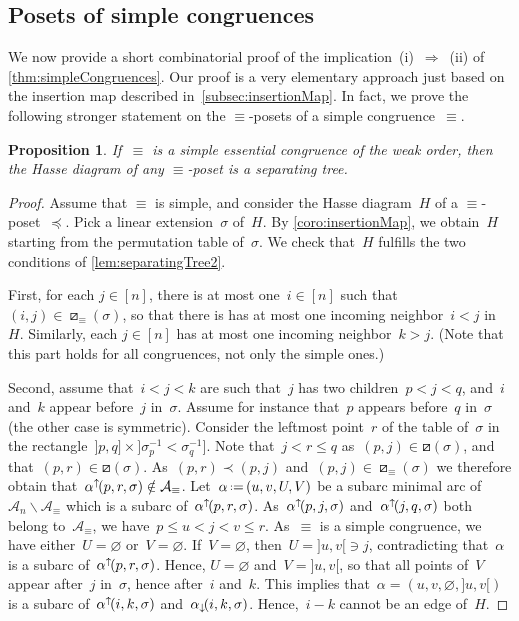 \documentclass{amsart}
\newtheorem{proposition}[theorem]{Proposition}
\theoremstyle{definition}
\newcommand{\ssm}{\smallsetminus} %
\newcommand{\eqdef}{\mbox{\,\raisebox{0.2ex}{\scriptsize\ensuremath{\mathrm:}}\ensuremath{=}\,}} %
\newcommand{\arcs}{{\mathcal{A}}} %
\newcommand{\arcDown}{\smash{\alpha_{\downarrow\!}}} %
\newcommand{\arcUp}{\smash{\alpha^{\uparrow\!}}} %
\begin{document}

\subsection{Posets of simple congruences}
\label{subsec:posetsSimpleCongruences}

We now provide a short combinatorial proof of the implication~(i)~$\Longrightarrow$~(ii) of \cref{thm:simpleCongruences}.
Our proof is a very elementary approach just based on the insertion map described in~\cref{subsec:insertionMap}.
In fact, we prove the following stronger statement on the $\equiv$-posets of a simple congruence~$\equiv$.

\begin{proposition}
\label{prop:simpleImpliesSeparatingTrees}
If~$\equiv$ is a simple essential congruence of the weak order, then the Hasse diagram of any $\equiv$-poset is a separating tree.
\end{proposition}

\begin{proof}
Assume that $\equiv$ is simple, and consider the Hasse diagram~$H$ of a $\equiv$-poset~$\preccurlyeq$.
Pick a linear extension~$\sigma$ of~$H$.
By \cref{coro:insertionMap}, we obtain~$H$ starting from the permutation table of~$\sigma$.
We check that~$H$ fulfills the two conditions of \cref{lem:separatingTree2}.

First, for each $j \in [n]$, there is at most one~$i \in [n]$ such that~$(i,j) \in \boxslash_\equiv(\sigma)$, so that there is has at most one incoming neighbor~$i < j$ in~$H$.
Similarly, each $j \in [n]$ has at most one incoming neighbor~$k > j$.
(Note that this part holds for all congruences, not only the simple ones.)

Second, assume that~$i < j < k$ are such that~$j$ has two children~$p < j < q$, and~$i$ and~$k$ appear before~$j$ in~$\sigma$.
Assume for instance that~$p$ appears before~$q$ in~$\sigma$ (the other case is symmetric).
Consider the leftmost point~$r$ of the table of~$\sigma$ in the rectangle~${]p, q]} \times {]\sigma^{-1}_p < \sigma^{-1}_q]}$.
Note that~${j < r \le q}$ as~$(p,j) \in \boxslash(\sigma)$, and that~$(p,r) \in \boxslash(\sigma)$.
As~$(p, r) \prec (p, j)$ and~$(p, j) \in \boxslash_\equiv(\sigma)$ we therefore obtain that~$\arcUp(p, r, \sigma) \notin \arcs_\equiv$.
Let~$\alpha \eqdef (u, v, U, V)$ be a subarc minimal arc of~$\arcs_n \ssm \arcs_\equiv$ which is a subarc of~$\arcUp(p, r, \sigma)$.
As~$\arcUp(p, j, \sigma)$ and~$\arcUp(j, q, \sigma)$ both belong to~$\arcs_\equiv$, we have~$p \le u < j < v \le r$.
As~$\equiv$ is a simple congruence, we have either~$U = \varnothing$ or~$V = \varnothing$.
If~$V = \varnothing$, then~$U = {]u,v[} \ni j$, contradicting that~$\alpha$ is a subarc of~$\arcUp(p, r, \sigma)$.
Hence, $U = \varnothing$ and~$V = {]u,v[}$, so that all points of~$V$ appear after~$j$ in~$\sigma$, hence after~$i$ and~$k$.
This implies that~$\alpha = (u, v, \varnothing, {]u,v[})$ is a subarc of~$\arcUp(i, k, \sigma)$ and~$\arcDown(i, k, \sigma)$.
Hence,~$i-k$ cannot be an edge of~$H$.
\end{proof}
\end{document}
